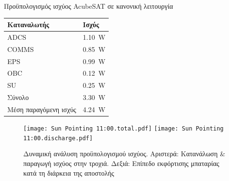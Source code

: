 \documentclass[a4paper,nobib]{tufte-book}
\begin{document}
\begin{margintable}
	\caption{Προϋπολογισμός ισχύος AcubeSAT σε κανονική λειτουργία}
	\label{tab:power_budget}
	\begin{tabularx}{\linewidth}{@{}lX@{}}
		\toprule
		\textbf{Καταναλωτής}            & \textbf{Ισχύς}            \\ \midrule
		\acs{ADCS}          & \SI{1.10}{\watt} \\
		\acs{COMMS}         & \SI{0.85}{\watt} \\
		\acs{EPS}           & \SI{0.99}{\watt} \\
		\acs{OBC}           & \SI{0.12}{\watt} \\
		\acs{SU}            & \SI{0.25}{\watt} \\ \midrule
		Σύνολο               & \SI{3.30}{\watt} \\
	    Μέση παραγόμενη ισχύς & \SI{4.24}{\watt} \\ \bottomrule
	\end{tabularx}
\end{margintable}

\FloatBarrier

\begin{figure}[h]
	\texttt{[image: Sun Pointing 11:00.total.pdf]}
	\hfill
	\texttt{[image: Sun Pointing 11:00.discharge.pdf]}

	\caption[Δυναμική ανάλυση προϋπολογισμού ισχύος]{Δυναμική ανάλυση προϋπολογισμού ισχύος. Αριστερά: Κατανάλωση \& παραγωγή ισχύος στην τροχιά. Δεξιά: Επίπεδο εκφόρτισης μπαταρίας κατά τη διάρκεια της αποστολής}
\end{figure}
\end{document}
